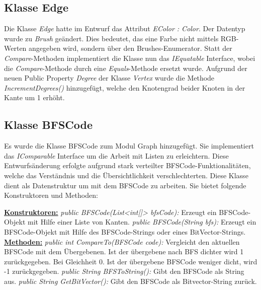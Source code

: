 \documentclass[13pt]{scrreprt}
\begin{document}
	\subsection{Klasse Edge}
	Die Klasse \textit{Edge} hatte im Entwurf das Attribut \textit{EColor : Color}. Der Datentyp wurde zu \textit{Brush} geändert.
	Dies bedeutet, das eine Farbe nicht mittels RGB-Werten angegeben wird, sondern über den Brushes-Enumerator.
	Statt der \textit{Compare}-Methoden implementiert die Klasse nun das \textit{IEquatable} Interface, wobei die \textit{Compare}-Methode durch eine \textit{Equals}-Methode ersetzt wurde.
	Aufgrund der neuen Public Property \textit{Degree} der Klasse \textit{Vertex} wurde die Methode \textit{IncrementDegrees()} hinzugefügt, welche den Knotengrad beider Knoten in der Kante um 1 erhöht.
	
	\newpage
	\subsection{Klasse BFSCode}
	Es wurde die Klasse BFSCode zum Modul Graph hinzugefügt. Sie implementiert das \textit{IComparable} Interface um die Arbeit mit Listen zu erleichtern. Diese Entwurfsänderung erfolgte aufgrund stark verteilter BFSCode-Funktionalitäten, welche das Verständnis und die Übersichtlichkeit verschlechterten. Diese Klasse dient als Datenstruktur um mit dem BFSCode zu arbeiten.
	Sie bietet folgende Konstruktoren und Methoden:
	
	\begin{flushleft}
    \underline{\textbf{Konstruktoren:}}
    \newline
    \textit{public BFSCode(List<int[]> bfsCode): } Erzeugt ein BFSCode-Objekt mit Hilfe einer Liste von Kanten.
	\newline
	\textit{public BFSCode(String bfs): } Erzeugt ein BFSCode-Objekt mit Hilfe des BFSCode-Strings oder eines BitVector-Strings.
	\newline
	\underline{\textbf{Methoden:}}
	\newline
	\textit{public int CompareTo(BFSCode code): } Vergleicht den aktuellen BFSCode mit dem Übergebenen. Ist der übergebene nach BFS dichter wird 1 zurückgegeben. Bei Gleichheit 0. Ist der übergebene BFSCode weniger dicht, wird -1 zurückgegeben.
	\newline
	\textit{public String BFSToString(): } Gibt den BFSCode als String aus.
	\newline
	\textit{public String GetBitVector(): } Gibt den BFSCode als Bitvector-String zurück.
	\end{flushleft}
\end{document}
